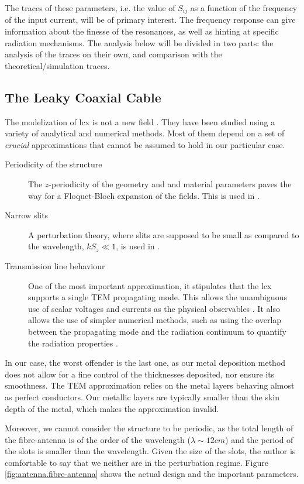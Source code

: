 The traces of these parameters, i.e. the value of $S_{ij}$ as a function of 
the frequency of the input current, will be of primary interest. The frequency
response can give information about the finesse of the resonances, as well as
hinting at specific radiation mechanisms. The analysis below will be divided
in two parts: the analysis of the traces on their own, and comparison with the 
theoretical/simulation traces.

\subsection{The Leaky Coaxial Cable}
The modelization of \gls{lcx} is not a new field \cite{DEL1980,WAN2001,KIM2007,ADD2008}.
They have been studied using a variety of analytical and numerical methods. Most of them 
depend on a set of \textit{crucial} approximations that cannot be assumed to hold 
in our particular case.

\begin{description}
	\item [Periodicity of the structure] The $z$-periodicity of the geometry and 
		and material parameters paves the way for a Floquet-Bloch expansion of the 
		fields. This is used in \cite{WAN2001}.
	\item [Narrow slits] A perturbation theory, where slits are supposed to be 
			small as compared to the wavelength, $kS_z\ll1$, is used in \cite{KIM2007}.
	\item [Transmission line behaviour] One of the most important approximation, it stipulates
			that the \gls{lcx} supports a single TEM propagating mode. This allows the 
			unambiguous use of scalar voltages and currents as the physical observables
			\cite{PAU2007}. It also allows
			the use of simpler numerical methods, such as using the overlap between the 
			propagating mode and the radiation continuum to quantify the radiation 
			properties \cite{SHI1989,ADD2008}. 
\end{description}

In our case, the worst offender is the last one, as our metal deposition method
does not allow for a fine control of the thicknesses deposited, nor ensure its
smoothness. The TEM approximation relies on the metal layers behaving almost as 
perfect conductors. Our metallic layers are typically smaller than the skin
depth of the metal, which makes the approximation invalid. 

Moreover, we cannot consider the structure to be periodic, as the total 
length of the fibre-antenna is of the order of the wavelength ($\lambda\sim12\unit{cm}$) and the period
of the slots is smaller than the wavelength. Given the size of the slots, 
the author is comfortable to say that we neither are in the perturbation regime. 
Figure \ref{fig:antenna.fibre-antenna} shows the actual design and the important parameters.

